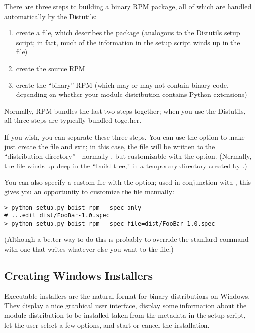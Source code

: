 \documentclass{howto}
\begin{document}
There are three steps to building a binary RPM package, all of which are 
handled automatically by the Distutils:
\begin{enumerate}
\item create a  file, which describes the package (analogous 
  to the Distutils setup script; in fact, much of the information in the 
  setup script winds up in the  file)
\item create the source RPM
\item create the ``binary'' RPM (which may or may not contain binary
  code, depending on whether your module distribution contains Python
  extensions)
\end{enumerate}
Normally, RPM bundles the last two steps together; when you use the
Distutils, all three steps are typically bundled together.

If you wish, you can separate these three steps.  You can use the
 option to make  just
create the  file and exit; in this case, the 
file will be written to the ``distribution directory''---normally
, but customizable with the 
option.  (Normally, the  file winds up deep in the ``build
tree,'' in a temporary directory created by .)

You can also specify a custom  file with the
 option; used in conjunction with
, this gives you an opportunity to customize
the  file manually:

\begin{verbatim}
> python setup.py bdist_rpm --spec-only
# ...edit dist/FooBar-1.0.spec
> python setup.py bdist_rpm --spec-file=dist/FooBar-1.0.spec
\end{verbatim}

(Although a better way to do this is probably to override the standard
 command with one that writes whatever else you want
to the  file.)


\subsection{Creating Windows Installers}
\label{creating-wininst}

Executable installers are the natural format for binary distributions
on Windows.  They display a nice graphical user interface, display
some information about the module distribution to be installed taken
from the metadata in the setup script, let the user select a few
options, and start or cancel the installation.
\end{document}
